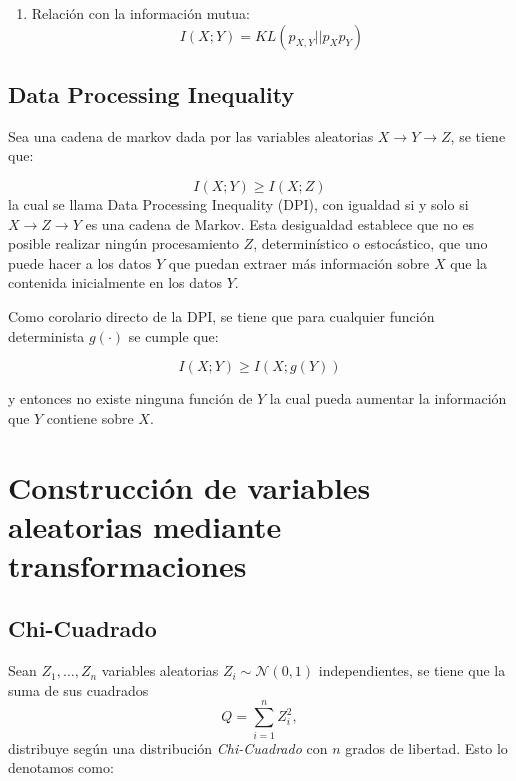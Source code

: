\begin{prop}
\begin{enumerate}
    \item Relación con la información mutua:
    \[I(X;Y)=KL(p_{X,Y}||p_X p_Y)\]
\end{enumerate}
\end{prop}


\subsection{Data Processing Inequality}

\begin{theorem}
Sea una cadena de markov dada por las variables aleatorias $X\rightarrow Y\rightarrow Z$, se tiene que:

\[I(X;Y)\geq I(X;Z)\]
la cual se llama Data Processing Inequality (DPI), con igualdad si y solo si $X\rightarrow Z\rightarrow Y$ es una cadena de Markov. Esta desigualdad establece que no es posible realizar ningún procesamiento $Z$, determinístico o estocástico, que uno puede hacer a los datos $Y$ que puedan extraer más información sobre $X$ que la contenida inicialmente en los datos $Y$. 
\end{theorem}

Como corolario directo de la DPI, se tiene que para cualquier función determinista $g(\cdot)$ se cumple que:

\[I(X;Y)\geq I(X;g(Y))\]

y entonces no existe ninguna función de $Y$ la cual pueda aumentar la información que $Y$ contiene sobre $X$.




\section{Construcción de variables aleatorias mediante transformaciones}

\subsection{Chi-Cuadrado}

Sean $Z_1,\ldots, Z_n$ variables aleatorias $Z_i\sim\mathcal{N}(0,1)$ independientes, se tiene que la suma de sus cuadrados 
\[Q=\sum\limits_{i=1}^{n} Z_i^2,\]
distribuye según una distribución \textit{Chi-Cuadrado} con $n$ grados de libertad. Esto lo denotamos como:

